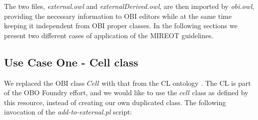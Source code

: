 \documentclass[a4paper,10pt,twocolumn]{article}
\begin{document}
The two files, \emph{external.owl} and \emph{externalDerived.owl}, are then imported by \emph{obi.owl}, providing the necessary information to OBI editors while at the same time keeping it independent from OBI proper classes.
In the following sections we present two different cases of application of the \ac{MIREOT} guidelines.


\subsection*{Use Case One - Cell class}

We replaced the \ac{OBI} class $Cell$ with that from the \ac{CL} ontology \cite{RefWorks:1559}. %
The \ac{CL} is part of the \ac{OBO} Foundry effort, and we would like to use the $cell$ class as defined by this resource, instead of creating our own duplicated class.
The following invocation of the \emph{add-to-external.pl} script:
\end{document}
